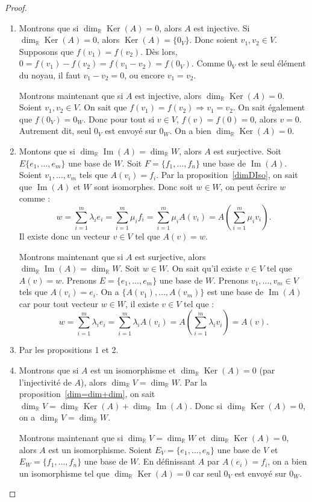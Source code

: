\documentclass{article}
\DeclareMathOperator{\Ker}{Ker}
\DeclareMathOperator{\Imf}{Im}
\newcommand{\R}{\mathbb R}
\theoremstyle{definition}
\theoremstyle{remark}
\begin{document}
		\begin{proof}~
		\begin{enumerate}
			\item Montrons que si $\dim_\R\Ker(A) = 0$, alors $A$ est injective. Si $\dim_\R\Ker(A) = 0$, alors $\Ker(A) = \{0_V\}$. Donc soient $v_1, v_2 \in V$. Supposons que
			$f(v_1) = f(v_2)$. Dès lors, $0 = f(v_1)-f(v_2) = f(v_1-v_2) = f(0_V)$. Comme $0_V$ est le seul élément du noyau, il faut $v_1-v_2 = 0$, ou encore $v_1 = v_2$.

			Montrons maintenant que si $A$ est injective, alors $\dim_\R\Ker(A) = 0$. Soient $v_1, v_2 \in V$. On sait que $f(v_1)=f(v_2) \Rightarrow v_1=v_2$. On sait
			également que $f(0_V) = 0_W$. Donc pour tout si $v \in V$, $f(v) = f(0) = 0$, alors $v=0$. Autrement dit, seul $0_V$ est envoyé sur $0_W$.
			On a bien $\dim_\R\Ker(A)=0$.

			\item Montons que si $\dim_\R\Imf(A) = \dim_\R W$, alors $A$ est surjective. Soit $E \{e_1, \ldots, e_m\}$ une base de $W$. Soit $F = \{f_1, \ldots, f_n\}$ une base
			de $\Imf(A)$. Soient $v_1, \ldots, v_m$ tels que $A(v_i) = f_i$. Par la proposition~\ref{dimDIso}, on sait que $\Imf(A)$ et $W$ sont isomorphes. Donc soit
			$w \in W$, on peut écrire $w$ comme : \[w = \sum_{i=1}^m\lambda_ie_i = \sum_{i=1}^m\mu_if_i = \sum_{i=1}^m\mu_iA(v_i) = A\left(\sum_{i=1}^m\mu_iv_i\right).\]
			Il existe donc un vecteur $v \in V$ tel que $A(v) = w$.

			Montrons maintenant que si $A$ est surjective, alors $\dim_\R \Imf(A)=\dim_\R W$. Soit $w \in W$. On sait qu'il existe $v \in V$ tel que $A(v) = w$. Prenons
			$E = \{e_1, \ldots, e_m\}$ une base de $W$. Prenons $v_1, \ldots, v_m \in V$ tels que $A(v_i) = e_i$. On a $\{A(v_1), \ldots, A(v_m)\}$ est une base de $\Imf(A)$ car
			pour tout vecteur $w \in W$, il existe $v \in V$ tel que : \[w = \sum_{i=1}^m\lambda_ie_i = \sum_{i=1}^m\lambda_iA(v_i) = A\left(\sum_{i=1}^m\lambda_iv_i\right)
			= A(v).\]

			\item Par les propositions 1 et 2.

			\item Montrons que si $A$ est un isomorphisme et $\dim_\R\Ker(A) = 0$ (par l'injectivité de $A$), alors $\dim_\R V = \dim_\R W$. Par la proposition~\ref{dim=dim+dim},
			on sait $\dim_\R V = \dim_\R \Ker(A) + \dim_\R\Imf(A)$. Donc si $\dim_\R \Ker(A) = 0$, on a $\dim_\R V = \dim_\R W$.

			Montrons maintenant que si $\dim_\R V = \dim_\R W$ et $\dim_\R \Ker(A) = 0$, alors $A$ est un isomorphisme. Soient $E_V = \{e_1, \ldots, e_n\}$ une base de $V$
			et $E_W = \{f_1, \ldots, f_n\}$ une base de $W$. En définissant $A$ par $A(e_i) = f_i$, on a bien un isomorphisme tel que $\dim_\R\Ker(A) = 0$ car seul $0_V$ est
			envoyé sur $0_W$.


\end{enumerate}
\end{proof}
\end{document}
